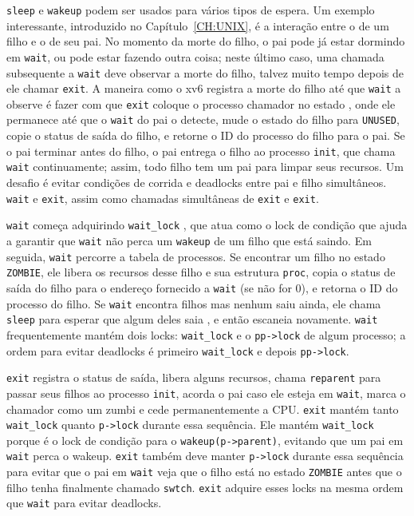 {%

\lstinline{sleep}
e
\lstinline{wakeup}
podem ser usados para vários tipos de espera.
Um exemplo interessante, introduzido no Capítulo~\ref{CH:UNIX},
é a interação entre o  de um filho
e o  de seu pai.
No momento da morte do filho, o pai pode já
estar dormindo em {\tt wait}, ou pode estar fazendo outra coisa;
neste último caso, uma chamada subsequente a {\tt wait} deve
observar a morte do filho, talvez muito tempo depois de ele chamar {\tt exit}.
A maneira como o xv6 registra a morte do filho até que {\tt wait}
a observe é fazer com que {\tt exit} coloque o processo chamador no estado ,
onde ele permanece até que o {\tt wait} do pai o detecte, mude
o estado do filho para {\tt UNUSED}, copie o status de saída do filho,
e retorne o ID do processo do filho para o pai.
Se o pai terminar antes do filho, o
pai entrega o filho ao processo
\lstinline{init},
que chama {\tt wait} continuamente;
assim,
todo filho tem um pai para limpar seus recursos.
Um desafio é
evitar condições de corrida e deadlocks entre
pai e filho simultâneos.
\lstinline{wait}
e
\lstinline{exit},
assim como chamadas simultâneas de
\lstinline{exit} e \lstinline{exit}.

\lstinline{wait} começa adquirindo
\lstinline{wait_lock}
,
que atua como o lock de condição que ajuda a garantir que \lstinline{wait} não perca um \lstinline{wakeup}
de um filho que está saindo.
Em seguida, \lstinline{wait} percorre a tabela de processos.
Se encontrar um filho no estado \texttt{ZOMBIE},
ele libera os recursos desse filho e
sua estrutura \lstinline{proc}, copia
o status de saída do filho para o endereço fornecido a \lstinline{wait}
(se não for 0),
e retorna o ID do processo do filho.
Se
\lstinline{wait}
encontra filhos mas nenhum saiu ainda,
ele chama
\lstinline{sleep}
para esperar que algum deles saia
,
e então escaneia novamente.
\lstinline{wait} frequentemente mantém dois locks:
\lstinline{wait_lock} e o \lstinline{pp->lock} de algum processo;
a ordem para evitar deadlocks é primeiro \lstinline{wait_lock}
e depois \lstinline{pp->lock}.

\lstinline{exit}  registra o status
de saída, libera alguns recursos, chama \lstinline{reparent} para passar seus
filhos ao processo \lstinline{init}, acorda o pai caso
ele esteja em \lstinline{wait}, marca o chamador como um zumbi
e cede permanentemente a CPU. \lstinline{exit} mantém tanto
\lstinline{wait_lock} quanto \lstinline{p->lock} durante essa
sequência.
Ele mantém \lstinline{wait_lock} porque
é o lock de condição para o \lstinline{wakeup(p->parent)}, evitando que um pai em
\lstinline{wait} perca o wakeup. \lstinline{exit} também deve manter
\lstinline{p->lock} durante essa sequência para evitar que o pai em
\lstinline{wait} veja que o filho está no estado
\lstinline{ZOMBIE} antes que o filho tenha finalmente chamado
\lstinline{swtch}. \lstinline{exit} adquire esses locks na
mesma ordem que \lstinline{wait} para evitar deadlocks.

}
